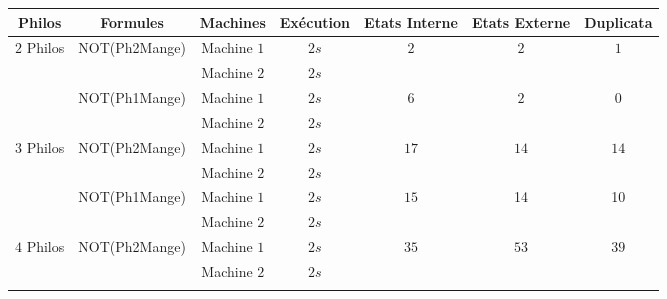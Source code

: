 \begin{tableth}
	\centering
	\begin{tabular}{|c|c|c||c||c|c|c|}
		\hline
		          Philos            &                Formules                &  Machines   & Exécution &     Etats Interne     &     Etats Externe     &       Duplicata       \\ \hline
		\multirow{4}{*}{$2$ Philos} & \multirow{2}{*}{{\tiny NOT(Ph2Mange)}} & Machine $1$ &  $2 s $   & \multirow{2}{*}{$2$}  & \multirow{2}{*}{$2$}  & \multirow{2}{*}{$1$}  \\ \cline{3-4}
		                            &                                        & Machine $2$ &   $2 s$   &                       &                       &                       \\ \cline{2-4}\cline{4-7}
		                            &  \multirow{2}{*}{\tiny NOT(Ph1Mange)}  & Machine $1$ &   $2 s$   & \multirow{2}{*}{$6$}  & \multirow{2}{*}{$2$}  & \multirow{2}{*}{$0$}  \\ \cline{3-4}
		                            &                                        & Machine $2$ &   $2 s$   &                       &                       &                       \\ \hline\hline
		\multirow{4}{*}{$3$ Philos} &  \multirow{2}{*}{\tiny NOT(Ph2Mange)}  & Machine $1$ &   $2 s$   & \multirow{2}{*}{$17$} & \multirow{2}{*}{$14$} & \multirow{2}{*}{$14$} \\ \cline{3-4}
		                            &                                        & Machine $2$ &   $2 s$   &                       &                       &                       \\ \cline{2-4}\cline{4-7}
		                            &  \multirow{2}{*}{\tiny NOT(Ph1Mange)}  & Machine $1$ &  $2 s $   & \multirow{2}{*}{$15$} &  \multirow{2}{*}{14}  &  \multirow{2}{*}{10}  \\ \cline{3-4}
		                            &                                        & Machine $2$ &   $2 s$   &                       &                       &                       \\ \hline\hline
		\multirow{6}{*}{$4$ Philos} &  \multirow{3}{*}{\tiny NOT(Ph2Mange)}  & Machine $1$ &   $2 s$   & \multirow{2}{*}{$35$} & \multirow{2}{*}{$53$} & \multirow{2}{*}{$39$} \\ \cline{3-4}
		                            &                                        & Machine $2$ &   $2 s$   &                       &                       &                       \\ \cline{3-7}

\end{tabular}
\end{tableth}

